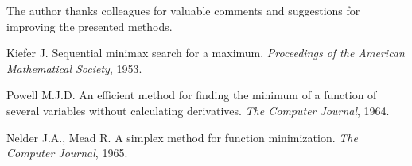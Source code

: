 \documentclass[12pt,a4paper]{article}
\begin{document}
The author thanks colleagues for valuable comments and suggestions for improving the presented methods.

\begin{thebibliography}{9}

Kiefer J. Sequential minimax search for a maximum. \textit{Proceedings of the American Mathematical Society}, 1953.

Powell M.J.D. An efficient method for finding the minimum of a function of several variables without calculating derivatives. \textit{The Computer Journal}, 1964.

Nelder J.A., Mead R. A simplex method for function minimization. \textit{The Computer Journal}, 1965.

\end{thebibliography}
\end{document}
